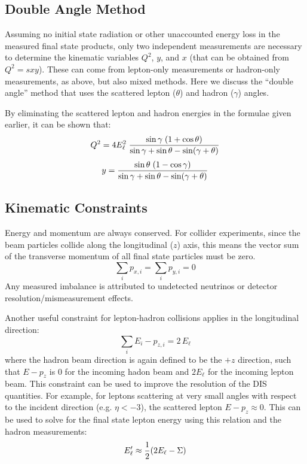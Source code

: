 \documentclass[12pt]{article}
\begin{document}
\subsection{Double Angle Method}

Assuming no initial state radiation or other unaccounted energy
loss in the measured final state products, only two independent
measurements are necessary to determine the kinematic variables $Q^2$,
$y$, and $x$ (that can be obtained from $Q^2 = s x y$). These can come
from lepton-only measurements or hadron-only measurements, as above,
but also mixed methods. Here we discuss the ``double angle'' method
that uses the scattered lepton ($\theta$)  and hadron ($\gamma$)
angles. 

By eliminating the scattered lepton and hadron energies in the
formulae given earlier, it can be shown that:
%
\begin{equation}
  Q^2 = 4 E_\ell^2\; {\sin\gamma\; (1+\cos\theta) \over
    \sin\gamma + \sin\theta -\sin (\gamma + \theta)}
\label{eq:DAQ2}
\end{equation}
%
\begin{equation}
  y = {\sin\theta\; (1-\cos\gamma) \over
    \sin\gamma + \sin\theta -\sin (\gamma + \theta)}
\label{eq:DAY}
\end{equation}
%

\subsection{Kinematic Constraints}

Energy and momentum are always conserved. For collider experiments,
since the beam particles collide along the longitudinal ($z$) axis, this
means the vector sum of the transverse momentum of all final state
particles must be zero.
%
\begin{equation}
\sum_i p_{x,i} = \sum_i p_{y,i} = 0
\label{eq:ptsum}
\end{equation}
%
Any measured imbalance is attributed to
undetected neutrinos or detector resolution/mismeasurement effects. 

Another useful constraint for lepton-hadron collisions applies in the
longitudinal direction:
%
\begin{equation}
\sum_i E_{i} - p_{z,i} = 2\,E_{\ell}
\label{eq:ptsum}
\end{equation}
%
where the hadron beam direction is again defined to be the $+z$
direction, such that $E-p_z$ is 0 for the incoming hadon beam and
$2E_\ell$ for the incoming lepton beam.  This constraint can be used
to improve the resolution of the DIS quantities. For example, for
leptons scattering at very small angles with respect to the incident
direction (e.g. $\eta < -3$), the scattered lepton $E-p_z\approx
0$. This can be used to solve for the final state lepton energy using
this relation and the hadron measurements:
%
\begin{equation}
E^\prime_\ell \approx {1\over 2}(2 E_\ell - \Sigma)
\label{eq:leptonenergy}
\end{equation}
%
\end{document}
